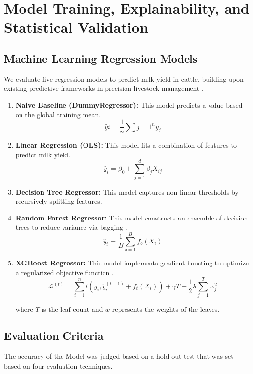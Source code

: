 \documentclass[conference]{IEEEtran}
\begin{document}
		\section{Model Training, Explainability, and Statistical Validation}
		
		\subsection{Machine Learning Regression Models}
		We evaluate five regression models to predict milk yield in cattle, building upon existing predictive frameworks in precision livestock management \cite{ref6, ref7}.
		
		\begin{enumerate}
			\item \textbf{Naive Baseline (DummyRegressor):} This model predicts a value based on the global training mean.
			$$\hat{y}i = \frac{1}{n} \sum{j=1}^{n} y_j$$
			
			\item \textbf{Linear Regression (OLS):} This model fits a combination of features to predict milk yield.
			$$\hat{y}_i = \beta_0 + \sum_{j=1}^{d} \beta_j X_{ij}$$
			
			\item \textbf{Decision Tree Regressor:} This model captures non-linear thresholds by recursively splitting features.
			
			\item \textbf{Random Forest Regressor:} This model constructs an ensemble of decision trees to reduce variance via bagging \cite{ref6}.
			$$\hat{y}_i = \frac{1}{B} \sum_{b=1}^{B} f_b(X_i)$$
			
			\item \textbf{XGBoost Regressor:} This model implements gradient boosting to optimize a regularized objective function \cite{ref3}.
			$$\mathcal{L}^{(t)} = \sum_{i=1}^{n} l(y_i, \hat{y}_i^{(t-1)} + f_t(X_i)) + \gamma T + \frac{1}{2} \lambda \sum_{j=1}^{T} w_j^2$$
			
			where $T$ is the leaf count and $w$ represents the weights of the leaves.
		\end{enumerate}
		
		\subsection{Evaluation Criteria}
		The accuracy of the Model was judged based on a hold-out test that was set based on four evaluation techniques.
		
\end{document}

